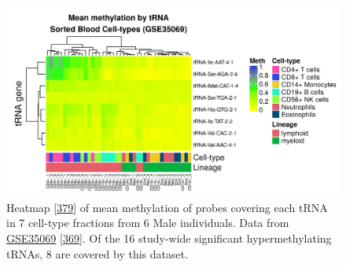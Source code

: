 \documentclass[
]{book}
\begin{document}
\begin{figure}

{\centering \includegraphics[width=1\linewidth]{./figs/meanMethbytRNAMatLowBB6_bl} 

}

\caption{Heatmap {[}\protect\hyperlink{ref-Gu2016}{379}{]} of mean methylation of probes covering each tRNA in 7 cell-type fractions from 6 Male individuals. Data from \href{https://www.ncbi.nlm.nih.gov/geo/query/acc.cgi?acc=GSE35069}{GSE35069} {[}\protect\hyperlink{ref-Reinius2012}{369}{]}. Of the 16 study-wide significant hypermethylating tRNAs, 8 are covered by this dataset.}\label{fig:meanMethbytRNAMatLowBB6}
\end{figure}
\end{document}
